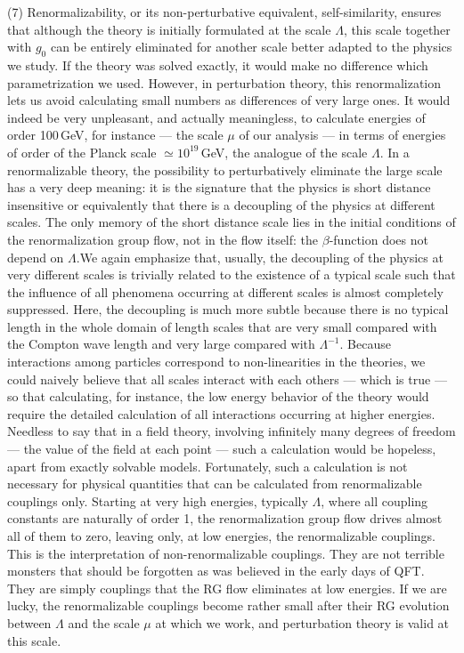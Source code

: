 \documentclass[floatfix,twocolumn,preprintnumbers,amsmath,amssymb,prb]{revtex4}
\begin{document}
{{(7) Renormalizability, or its non-perturbative equivalent,
self-similarity, ensures that although the theory is initially
formulated at the scale $\Lambda$, this scale together with $g_0$
can be entirely eliminated for another scale better adapted to the
physics we study. If the theory was solved exactly, it would make
no difference which parametrization we used.
However, in perturbation theory, this renormalization lets us
avoid calculating small numbers as differences of very large
ones. It would indeed be very unpleasant, and
actually meaningless, to calculate energies of order 100\,GeV, for
instance --- the scale
$\mu$ of our analysis --- in terms of energies of order of the 
Planck scale $\simeq 10^{19}$\,GeV, the analogue of the scale
$\Lambda$. In a renormalizable theory, the possibility to
perturbatively eliminate the large scale has a very deep
meaning: it is the signature that the physics is short
distance insensitive or equivalently that there is a 
decoupling of the physics at different scales. The only memory of
the short distance scale lies in the initial conditions of the
renormalization group flow, not in the flow itself: the
$\beta$-function does not depend on $\Lambda$.We again
emphasize that, usually, the decoupling of the physics at very
different scales is trivially related to the existence of a
typical scale such that the influence of all phenomena occurring at
different scales is almost completely suppressed. Here, the
decoupling is much more subtle because there is no typical length
in the whole domain of length scales that are very small compared
with the Compton wave length and very large compared with 
$\Lambda^{-1}$. Because interactions among particles correspond to
non-linearities in the theories, we could naively believe that all
scales interact with each others --- which is true --- so that
calculating, for instance, the low energy behavior of the theory
would require the detailed calculation of all interactions
occurring at higher energies. Needless to say that in a field
theory, involving infinitely many degrees of freedom --- the value
of the field at each point --- such a calculation would be 
hopeless, apart from exactly solvable models. Fortunately, such a calculation
is not necessary for physical quantities that can be calculated
from renormalizable couplings only. Starting at very high
energies, typically
$\Lambda$, where all coupling constants are naturally of order 1,
the renormalization group flow drives almost all of them to zero,
leaving only, at low energies, the renormalizable couplings. This
is the interpretation of non-renormalizable couplings. They are
not terrible monsters that should be forgotten as was believed in
the early days of QFT. They are simply couplings that the RG flow
eliminates at low energies. If we are lucky, the renormalizable
couplings become rather small after their RG evolution between
$\Lambda$ and the scale $\mu$ at which we work, and perturbation
theory is valid at this scale.

}}
\end{document}
